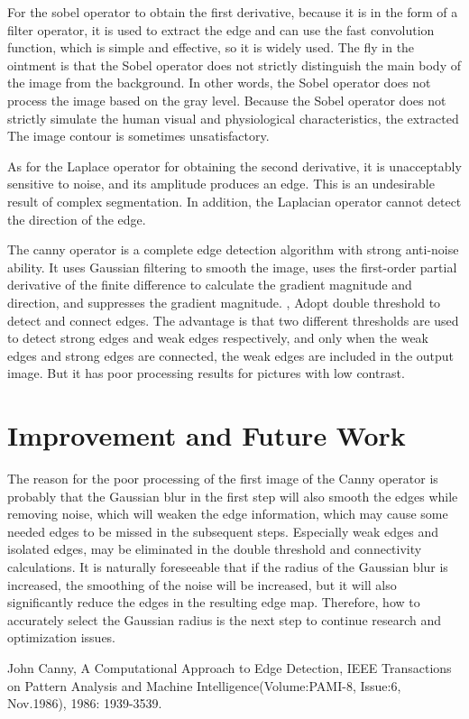 \documentclass[review]{cvpr}
\begin{document}
For the sobel operator to obtain the first derivative, because it is in the form of a filter operator, it is used to extract the edge and can use the fast convolution function, which is simple and effective, so it is widely used. The fly in the ointment is that the Sobel operator does not strictly distinguish the main body of the image from the background. In other words, the Sobel operator does not process the image based on the gray level. Because the Sobel operator does not strictly simulate the human visual and physiological characteristics, the extracted The image contour is sometimes unsatisfactory.

As for the Laplace operator for obtaining the second derivative, it is unacceptably sensitive to noise, and its amplitude produces an edge. This is an undesirable result of complex segmentation. In addition, the Laplacian operator cannot detect the direction of the edge.

The canny operator is a complete edge detection algorithm with strong anti-noise ability. It uses Gaussian filtering to smooth the image, uses the first-order partial derivative of the finite difference to calculate the gradient magnitude and direction, and suppresses the gradient magnitude. , Adopt double threshold to detect and connect edges. The advantage is that two different thresholds are used to detect strong edges and weak edges respectively, and only when the weak edges and strong edges are connected, the weak edges are included in the output image. But it has poor processing results for pictures with low contrast.

\section{Improvement and Future Work}

The reason for the poor processing of the first image of the Canny operator is probably that the Gaussian blur in the first step will also smooth the edges while removing noise, which will weaken the edge information, which may cause some needed edges to be missed in the subsequent steps. Especially weak edges and isolated edges, may be eliminated in the double threshold and connectivity calculations. It is naturally foreseeable that if the radius of the Gaussian blur is increased, the smoothing of the noise will be increased, but it will also significantly reduce the edges in the resulting edge map. Therefore, how to accurately select the Gaussian radius is the next step to continue research and optimization issues.


\begin{thebibliography}{99}  
John Canny, A Computational Approach to Edge Detection, IEEE Transactions on Pattern Analysis and Machine Intelligence(Volume:PAMI-8, Issue:6, Nov.1986), 1986: 1939-3539.   
\end{thebibliography}
\end{document}
